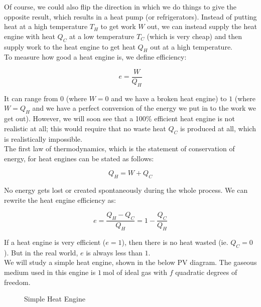 \documentclass[12pt, a4paper]{article}
\begin{document}
Of course, we could also flip the direction in which we do things to give the opposite result, which results in a heat pump (or refrigerators). Instead of putting heat at a high temperature $T_H$ to get work $W$ out, we can instead supply the heat engine with heat $Q_C$ at a low temperature $T_C$ (which is very cheap) and then supply work to the heat engine to get heat $Q_H$ out at a high temperature. \\

To measure how good a heat engine is, we define efficiency:

\[e=\frac{W}{Q_H}\]

It can range from $0$ (where $W=0$ and we have a broken heat engine) to $1$ (where $W=Q_H$ and we have a perfect conversion of the energy we put in to the work we get out). However, we will soon see that a 100\% efficient heat engine is not realistic at all; this would require that no waste heat $Q_C$ is produced at all, which is realistically impossible. \\

The first law of thermodynamics, which is the statement of conservation of energy, for heat engines can be stated as follows:

\[Q_H=W+Q_C\]

No energy gets lost or created spontaneously during the whole process. We can rewrite the heat engine efficiency as:

\[e=\frac{Q_H-Q_C}{Q_H}=1-\frac{Q_C}{Q_H}\]

If a heat engine is very efficient ($e=1$), then there is no heat wasted (ie. $Q_C=0$). But in the real world, $e$ is always less than $1$. \\

We will study a simple heat engine, shown in the below PV diagram. The gaseous medium used in this engine is $\SI{1}{\mole}$ of ideal gas with $f$ quadratic degrees of freedom.

\begin{figure}[H]
\centering
{}
\caption{Simple Heat Engine}
\end{figure}
\end{document}
